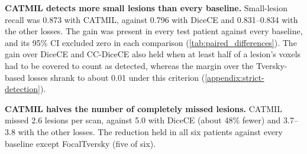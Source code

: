 \textbf{CATMIL detects more small lesions than every baseline.} Small-lesion
recall was 0.873 with CATMIL, against 0.796 with DiceCE and 0.831--0.834
with the other losses. The gain was present in every test patient against
every baseline, and its 95\% CI excluded zero in each comparison
(\cref{tab:paired_differences}). The gain over DiceCE and CC-DiceCE also held when at least half of a
lesion's voxels had to be covered to count as detected, whereas the margin
over the Tversky-based losses shrank to about 0.01 under this criterion
(\cref{appendix:strict-detection}).

\textbf{CATMIL halves the number of completely missed lesions.} CATMIL
missed 2.6 lesions per scan, against 5.0 with DiceCE (about 48\% fewer) and
3.7--3.8 with the other losses. The reduction held in all six patients
against every baseline except FocalTversky (five of six).

